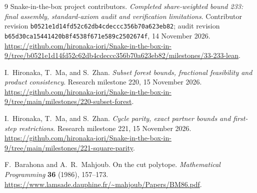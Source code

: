 \documentclass[11pt,a4paper]{article}
\begin{document}
\begin{thebibliography}{9}
Snake-in-the-box project contributors. \emph{Completed share-weighted bound
233: final assembly, standard-axiom audit and verification limitations}.
Contributor revision \texttt{b0521e1d14fd52c62db4cdeccc356b70a623eb82};
audit revision \texttt{b65d30ca15441420b8f4538f671e589c2502674f},
14 November 2026.
\url{https://github.com/hironaka-iori/Snake-in-the-box-in-9/tree/b0521e1d14fd52c62db4cdeccc356b70a623eb82/milestones/33-233-lean}.


I.~Hironaka, T.~Ma, and S.~Zhan. \emph{Subset forest bounds,
fractional feasibility and product consistency}. Research milestone 220,
15 November 2026.
\url{https://github.com/hironaka-iori/Snake-in-the-box-in-9/tree/main/milestones/220-subset-forest}.

I.~Hironaka, T.~Ma, and S.~Zhan. \emph{Cycle parity, exact partner bounds
and first-step restrictions}. Research milestone 221, 15 November 2026.
\url{https://github.com/hironaka-iori/Snake-in-the-box-in-9/tree/main/milestones/221-square-parity}.

F.~Barahona and A.~R.~Mahjoub. On the cut polytope.
\emph{Mathematical Programming} \textbf{36} (1986), 157--173.
\url{https://www.lamsade.dauphine.fr/~mahjoub/Papers/BM86.pdf}.

\end{thebibliography}
\end{document}
